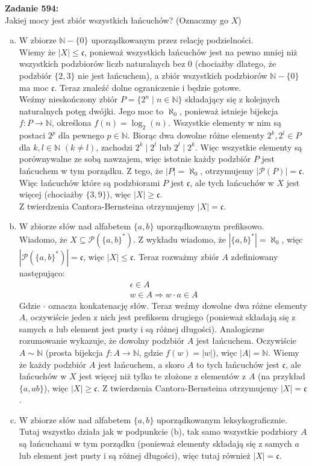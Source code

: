 \documentclass[10pt]{article}
\newcommand{\N}{\mathbb{N}}
\newcommand{\Pows}{\mathcal{P}}
\newcommand{\cont}{\mathfrak{c}}
\begin{document}
\textbf{Zadanie 594:} \\[10pt]
Jakiej mocy jest zbiór wszystkich łańcuchów? (Oznaczmy go $X$)
\begin{enumerate}[(a)]
    \item W zbiorze $\N - \{0\}$ uporządkowanym przez relację podzielności. \\[10pt]
    Wiemy że $|X| \leq \cont$, ponieważ wszystkich łańcuchów jest na pewno mniej niż wszystkich podzbiorów liczb naturalnych bez $0$ (chociażby dlatego, że podzbiór $\{2, 3\}$ nie jest łańcuchem), a zbiór wszystkich podzbiorów $\N - \{0\}$ ma moc $\cont$. Teraz znaleźć dolne ograniczenie i będzie gotowe. \\[5pt]
    Weźmy nieskończony zbiór $P = \{2^n \mid n \in \N \}$ składający się z kolejnych naturalnych potęg dwójki. Jego moc to $\aleph_0$, ponieważ istnieje bijekcja $f \colon P \to \N$, określona $f(n) = \log_2(n)$. Wszystkie elementy w nim są postaci $2^p$ dla pewnego $p \in \N$. Biorąc dwa dowolne różne elementy $2^k, 2^l \in P$ dla $k, l \in \N$ $(k \neq l)$, zachodzi $2^k \mid 2^l$ lub $2^l \mid 2^k$. Więc wszystkie elementy są porównywalne ze sobą nawzajem, więc istotnie każdy podzbiór $P$ jest łańcuchem w tym porządku. Z tego, że $|P| = \aleph_0$, otrzymujemy $|\Pows (P)| = \cont$. Więc łańcuchów które są podzbiorami $P$ jest $\cont$, ale tych łańcuchów w $X$ jest więcej (chociażby $\{3, 9\}$), więc $|X| \geq \cont$. \\[5pt]
    Z twierdzenia Cantora-Bernsteina otrzymujemy $|X| = \cont$.

    \item W zbiorze słów nad alfabetem $\{a, b\}$ uporządkowanym prefiksowo. \\[10pt]
    Wiadomo, że $X \subseteq \Pows(\{a, b\}^*)$. Z wykładu wiadomo, że $|\{a, b\}^*| = \aleph_0$, więc $|\Pows(\{a, b\}^*)| = \cont$, więc $|X| \leq \cont$. Teraz rozważmy zbiór $A$ zdefiniowany następująco:
    \begin{align*}
        \epsilon \in A \\
        w \in A \Longrightarrow w \cdot a \in A
    \end{align*}
    Gdzie $\cdot$ oznacza konkatenację słów. Teraz weźmy dowolne dwa różne elementy $A$, oczywiście jeden z nich jest prefiksem drugiego (ponieważ składają się z samych $a$ lub element jest pusty i są różnej długości). Analogiczne rozumowanie wykazuje, że dowolny podzbiór $A$ jest łańcuchem. Oczywiście $A \sim \N$ (prosta bijekcja $f\colon A \to \N$, gdzie $f(w) = |w|$), więc $|A| = \N$. Wiemy że każdy podzbiór $A$ jest łańcuchem, a skoro $A$ to tych łańcuchów jest $\cont$, ale łańcuchów w $X$ jest więcej niż tylko te złożone z elementów z $A$ (na przykład $\{a, ab\}$), więc $|X| \geq \cont$.
    Z twierdzenia Cantora-Bernsteina otrzymujemy $|X| = \cont$.

    \item W zbiorze słów nad alfabetem $\{a, b\}$ uporządkowanym leksykograficznie. \\[10pt]
    Tutaj wszystko działa jak w podpunkcie (b), tak samo wszystkie podzbiory $A$ są łańcuchami w tym porządku (ponieważ elementy składają się z samych $a$ lub element jest pusty i są różnej długości), więc tutaj również $|X| = \cont$.
\end{enumerate} 
\end{document}
